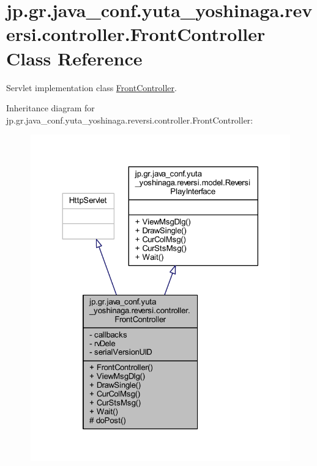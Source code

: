 \hypertarget{classjp_1_1gr_1_1java__conf_1_1yuta__yoshinaga_1_1reversi_1_1controller_1_1_front_controller}{}\section{jp.\+gr.\+java\+\_\+conf.\+yuta\+\_\+yoshinaga.\+reversi.\+controller.\+Front\+Controller Class Reference}
\label{classjp_1_1gr_1_1java__conf_1_1yuta__yoshinaga_1_1reversi_1_1controller_1_1_front_controller}


Servlet implementation class \hyperlink{classjp_1_1gr_1_1java__conf_1_1yuta__yoshinaga_1_1reversi_1_1controller_1_1_front_controller}{Front\+Controller}.  




Inheritance diagram for jp.\+gr.\+java\+\_\+conf.\+yuta\+\_\+yoshinaga.\+reversi.\+controller.\+Front\+Controller\+:\nopagebreak
\begin{figure}[H]
\begin{center}
\leavevmode
\includegraphics[width=324pt]{classjp_1_1gr_1_1java__conf_1_1yuta__yoshinaga_1_1reversi_1_1controller_1_1_front_controller__inherit__graph}
\end{center}
\end{figure}


